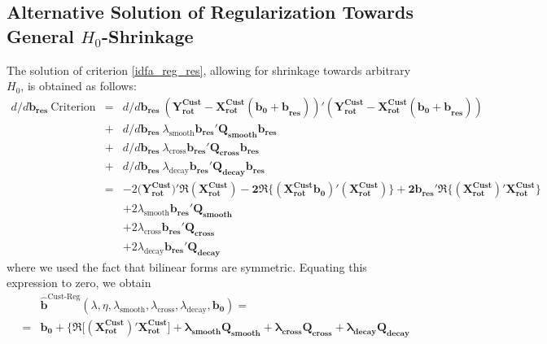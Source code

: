 \documentclass[11pt]{article}
\begin{document}
\begin{appendix}
\section{Alternative Solution of Regularization Towards General $H_0$-Shrinkage}

The solution of  criterion  \ref{idfa_reg_res}, allowing for shrinkage towards arbitrary $H_0$, is obtained as follows:  
\begin{eqnarray*}
d/d\mathbf{b_{\textrm{res}}}~\textrm{Criterion}&=&d/d\mathbf{b_{\textrm{res}}}~(\mathbf{Y_{\textrm{rot}}^{\textrm{Cust}}-X_{\textrm{rot}}^{\textrm{Cust}}\left(\mathbf{b_0+b}_{\textrm{res}}\right)})'(\mathbf{Y_{\textrm{rot}}^{\textrm{Cust}}-X_{\textrm{rot}}^{\textrm{Cust}}\left(\mathbf{b_0+b}_{\textrm{res}}\right)})\nonumber\\
&+&d/d\mathbf{b_{\textrm{res}}}~\lambda_{\textrm{smooth}}\mathbf{\mathbf{b_{\textrm{res}}}'Q_{smooth}\mathbf{b_{\textrm{res}}}}\\
&+&d/d\mathbf{b_{\textrm{res}}}~\lambda_{\textrm{cross}}\mathbf{\mathbf{b_{\textrm{res}}}'Q_{cross}\mathbf{b_{\textrm{res}}}}\\
&+&d/d\mathbf{b_{\textrm{res}}}~\lambda_{\textrm{decay}}\mathbf{\mathbf{b_{\textrm{res}}}'Q_{decay}\mathbf{b_{\textrm{res}}}}\\
&=&-2(\mathbf{Y_{\textrm{rot}}^{\textrm{Cust}})'\Re\left(X_{\textrm{rot}}^{\textrm{Cust}}\right)-
2\Re\bigg\{\mathbf{(X_{\textrm{rot}}^{\textrm{Cust}}b_0)'(X_{\textrm{rot}}^{\textrm{Cust}})}\bigg\}
+2\mathbf{b_{\textrm{res}}}'\Re\bigg\{(X_{\textrm{rot}}^{\textrm{Cust}})'X_{\textrm{rot}}^{\textrm{Cust}}\bigg\}}\\
&&+2\lambda_{\textrm{smooth}}\mathbf{\mathbf{b_{\textrm{res}}}'Q_{smooth}}\\
&&+2\lambda_{\textrm{cross}}\mathbf{\mathbf{b_{\textrm{res}}}'Q_{cross}}\\
&&+2\lambda_{\textrm{decay}}\mathbf{\mathbf{b_{\textrm{res}}}'Q_{decay}}
\end{eqnarray*}
where we used the fact that bilinear forms are symmetric. Equating this expression to zero, we obtain
\begin{eqnarray}\label{bregcustreg++}
&&\mathbf{\hat{b}}^{\textrm{Cust-Reg}}(\lambda,\eta,\lambda_{\textrm{smooth}},\lambda_{\textrm{cross}},\lambda_{\textrm{decay}},\mathbf{b_0})=\nonumber\\
&=&\mathbf{b_0}+\mathbf{\Big\{\Re\Big[(X_{\textrm{rot}}^{\textrm{Cust} })' X_{\textrm{rot}}^{\textrm{Cust}}\Big]+
\lambda_{\textrm{smooth}}\mathbf{Q_{smooth}}+\lambda_{\textrm{cross}}\mathbf{Q_{cross}}+\lambda_{\textrm{decay}}\mathbf{Q_{decay}}
}
\end{eqnarray}
\end{appendix}
\end{document}
